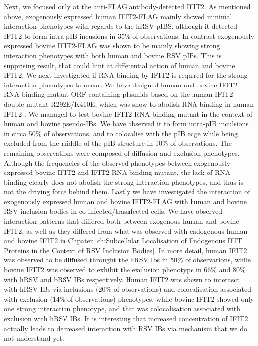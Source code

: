 Next, we focused only at the anti-FLAG antibody-detected IFIT2. As mentioned above, exogenously expressed human IFIT2-FLAG mainly showed minimal interaction phenotypes with regards to the hRSV pIBS, although it detected IFIT2 to form intra-pIB incusions in 35\% of observations. In contrast exogenously expressed bovine IFIT2-FLAG was shown to be mainly showing strong interaction phenotypes with both human and bovine RSV pIBs. This is supprising result, that could hint at differential action of human and bovine IFIT2. We next investigated if RNA binding by IFIT2 is required for the strong interaction phenotypes to occur. We have designed human and bovine IFIT2-RNA binding mutant ORF-containing plasmids based on the human IFIT2 double mutant R292E/K410E, which was show to abolish RNA binding in human IFIT2 \cite{Yang2012CrystalMechanisms}. We managed to test bovine IFIT2-RNA binding mutant in the context of human and bovine pseudo-IBs. We have observed it to form intra-pIB inculsions in circa 50\% of observations, and to colocalise with the pIB edge while being excluded from the middle of the pIB structure in 10\% of observations. The remaining observations were composed of diffusion and exclusion phenotypes. Although the frequencies of the observed phenotypes between exogenously expressed bovine IFIT2 and IFIT2-RNA binding mutant, the lack of RNA binding clearly does not abolish the strong interaction phenotypes, and thus is not the driving force behind them. Lastly we have investigated the interaction of exogenously expressed human and bovine IFIT2-FLAG with human and bovine RSV inclusion bodies in co-infected/trasnfected cells. We have observed interaction patterns that differed both between exogenous human and bovine IFIT2, as well as they differed from what was observed with endogenous human and bovine IFIT2 in Chpater \ref{ch:Subcellular Localisation of Endogenous IFIT Proteins in the Context of RSV Inclusion Bodies}. In more detail, human IFIT2 was observed to be diffused throught the hRSV Ibs in 50\% of observations, while bovine IFIT2 was observed to exhibit the exclusion phenotype in 66\% and 80\% with hRSV and bRSV IBs respectively. Human IFIT2 was shown to interasct with hRSV IBs via inclusions (20\% of observations) and colocalisation associated with exclusion (14\% of observations) phenotypes, while bovine IFIT2 showed only one strong interaction phenotype, and that was colocalisation associated with exclusion with hRSV IBs. It is interesting that increased concentration of IFIT2 actually leads to decreased interaction with RSV IBs via mechanism that we do not understand yet.

